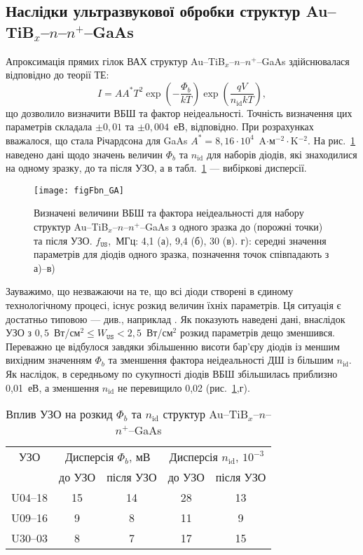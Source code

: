 \subsection{Наслідки ультразвукової обробки структур Au--TiB$_x$--$n$--$n^+$--GaAs}

Апроксимація прямих гілок ВАХ структур Au--TiB$_x$--$n$--$n^+$--GaAs здійснювалася відповідно до теорії ТЕ:
\begin{equation}\label{eqIVGAMS}
  I=AA^*T^2\exp\left(-\frac{\Phi_b}{kT}\right)\exp\left(\frac{qV}{n_\mathrm{id}kT}\right),
\end{equation}
що дозволило визначити ВБШ та фактор неідеальності.
Точність визначення цих параметрів складала $\pm0,01$ та $\pm0,004$~еВ, відповідно.
При розрахунках вважалося, що стала Річардсона для GaAs $A^*=8,16\cdot10^4$~A$\cdot$м$^{-2}\cdot$K$^{-2}$.
На рис.~\ref{figFbn_GA} наведено дані щодо значень величин $\Phi_b$ та $n_\mathrm{id}$
для наборів діодів, які знаходилися на одному зразку, до та після УЗО,
а в табл.~\ref{tabUS_GaAsForv} --- вибіркові дисперсії.



\begin{figure}
\center
\texttt{[image: figFbn\_GA]}%
\caption{\label{figFbn_GA}
Визначені величини ВБШ та фактора неідеальності для набору структур Au--TiB$_x$--$n$--$n^+$--GaAs
з одного зразка до (порожні точки) та після УЗО.
$f_\mathtt{US}$,~МГц: 4,1 (а), 9,4 (б), 30 (в).
г): середні значення параметрів для діодів одного зразка,
позначення точок співпадають з а)--в)
}
\end{figure}

Зауважимо, що незважаючи на те, що всі діоди створені в єдиному технологічному процесі,
існує розкид величин їхніх параметрів.
Ця ситуація є достатньо типовою --- див., наприклад \cite{SBD:rizn,Milenin1994}.
Як показують наведені дані, внаслідок УЗО з $0,5$~Вт/см$^2\leq W_\mathtt{US}<2,5$~Вт/см$^2$
розкид параметрів дещо зменшився.
Переважно це відбулося завдяки збільшенню висоти бар'єру діодів із меншим вихідним значенням $\Phi_b$ та
зменшення фактора неідеальності ДШ із більшим $n_\mathrm{id}$.
Як наслідок, в середньому по сукупності діодів ВБШ збільшилась приблизно 0,01~еВ, а зменшення $n_\mathrm{id}$ не
перевищило 0,02 (рис.~\ref{figFbn_GA},г).

\begin{table}
\caption{\label{tabUS_GaAsForv}Вплив УЗО на розкид
$\Phi_b$ та $n_\mathrm{id}$
структур
Au--TiB$_x$--$n$--$n^+$--GaAs
}
\center
\begin{tabular}{|c|c|c|c|c|}
\hline
УЗО&\multicolumn{2}{c|}{Дисперсія $\Phi_b$, мВ}&\multicolumn{2}{c|}{Дисперсія $n_\mathrm{id}$, $10^{-3}$}\\ \cline{2-5}
& до УЗО & після УЗО & до УЗО & після УЗО\\
\hline
U04--18&15&14&28&13\\ \hline
U09--16&9&8&11&9\\ \hline
U30--03&8&7&17&15\\ \hline
\end{tabular}
\end{table}

